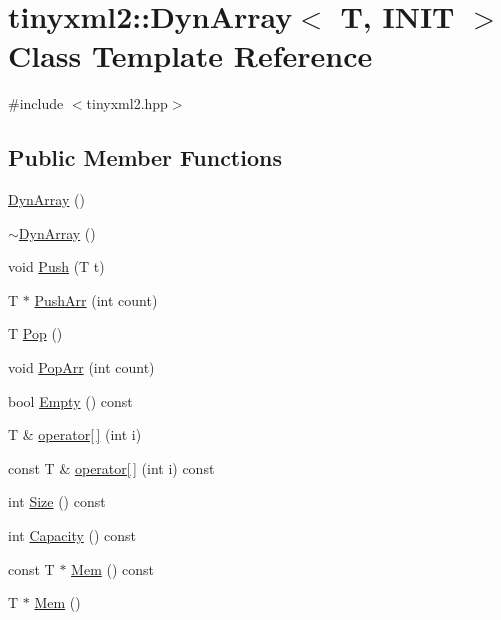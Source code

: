 \hypertarget{classtinyxml2_1_1_dyn_array}{\section{tinyxml2\-:\-:Dyn\-Array$<$ T, I\-N\-I\-T $>$ Class Template Reference}
\label{classtinyxml2_1_1_dyn_array}
}


{\ttfamily \#include $<$tinyxml2.\-hpp$>$}

\subsection*{Public Member Functions}
\begin{DoxyCompactItemize}
\item 
\hyperlink{classtinyxml2_1_1_dyn_array_af076df9203a7eda3f3501a0c84dbbb8a}{Dyn\-Array} ()
\item 
\hyperlink{classtinyxml2_1_1_dyn_array_ac7c2dc82db9010d09041ea6bfd921fdc}{$\sim$\-Dyn\-Array} ()
\item 
void \hyperlink{classtinyxml2_1_1_dyn_array_a498de53808ba0151fef54ea10bf51050}{Push} (T t)
\item 
T $\ast$ \hyperlink{classtinyxml2_1_1_dyn_array_aa3c360d40addc3b05121da9f60a01b4d}{Push\-Arr} (int count)
\item 
T \hyperlink{classtinyxml2_1_1_dyn_array_a2281e3342bc235bf391a67e362c75866}{Pop} ()
\item 
void \hyperlink{classtinyxml2_1_1_dyn_array_ab45c0836d8c0260a5b9eda7da80de71c}{Pop\-Arr} (int count)
\item 
bool \hyperlink{classtinyxml2_1_1_dyn_array_a080dc4dc68713964bb17745d4c833158}{Empty} () const 
\item 
T \& \hyperlink{classtinyxml2_1_1_dyn_array_a775a6ab4d41f0eb15bdd863d408dd58f}{operator\mbox{[}$\,$\mbox{]}} (int i)
\item 
const T \& \hyperlink{classtinyxml2_1_1_dyn_array_a1f4874c2608cbd68be1627fca9efd820}{operator\mbox{[}$\,$\mbox{]}} (int i) const 
\item 
int \hyperlink{classtinyxml2_1_1_dyn_array_a1299b257b62ea6b4983c488867f219b0}{Size} () const 
\item 
int \hyperlink{classtinyxml2_1_1_dyn_array_a8edbe90ed53b2e46b1b5cf53b261e4e7}{Capacity} () const 
\item 
const T $\ast$ \hyperlink{classtinyxml2_1_1_dyn_array_a1f39330daeb97d3d1dc3fc12dcf7ac67}{Mem} () const 
\item 
T $\ast$ \hyperlink{classtinyxml2_1_1_dyn_array_a0e0d60b399d54fad5b33d5008bc59c8e}{Mem} ()
\end{DoxyCompactItemize}


